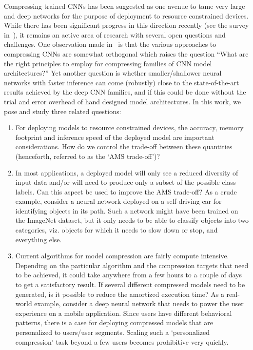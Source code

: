 \documentclass[../main]{subfiles}
\begin{document}
    Compressing trained CNNs has been suggested as one avenue to tame very large and deep networks for the purpose of deployment to resource constrained devices.
    While there has been significant progress in this direction recently (see the survey in~\cite{cheng2017survey}), it remains an active area of research with several open questions and challenges.
    One observation made in~\cite{cheng2017survey} is that the various approaches to compressing CNNs are somewhat orthogonal which raises the question ``What are the right principles to employ for compressing families of CNN model architectures?''
    Yet another question is whether smaller/shallower neural networks with faster inference can come (robustly) close to the state-of-the-art results achieved by the deep CNN families, and if this could be done without the trial and error overhead of hand designed model architectures.
    In this work, we pose and study three related questions:
    \begin{enumerate}
    	\item	For deploying models to resource constrained devices, the accuracy, memory footprint and inference speed of the deployed model are important considerations.
    	How do we control the trade-off between these quantities (henceforth, referred to as the `AMS trade-off')?
    	\item	In most applications, a deployed model will only see a reduced diversity of input data and/or will need to produce only a subset of the possible class labels.
    	Can this aspect be used to improve the AMS trade-off?
    	As a crude example, consider a neural network deployed on a self-driving car for identifying objects in its path.
    	Such a network might have been trained on the ImageNet dataset, but it only needs to be able to classify objects into two categories, viz. objects for which it needs to slow down or stop, and everything else.
    	\item	Current algorithms for model compression are fairly compute intensive.
    	Depending on the particular algorithm and the compression targets that need to be achieved, it could take anywhere from a few hours to a couple of days to get a satisfactory result.
    	If several different compressed models need to be generated, is it possible to reduce the amortized execution time?
    	As a real-world example, consider a deep neural network that needs to power the user experience on a mobile application.
    	Since users have different behavioral patterns, there is a case for deploying compressed models that are personalized to users/user segments.
    	Scaling such a `personalized compression' task beyond a few users becomes prohibitive very quickly.
    \end{enumerate}
    
\end{document}
